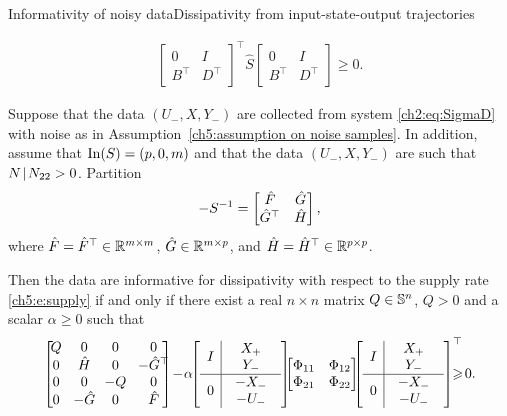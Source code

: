 \documentclass[aspectratio=169, handout, 10pt, hyperref=colorlinks]{beamer}
\begin{document}
\begin{frame}[allowframebreaks]{Informativity of noisy data}{Dissipativity from input-state-output trajectories}
\begin{lem}
\begin{align}
\begin{bmatrix}
    0&I \!\! \\
    B^\top&D^\top \!\!
    \end{bmatrix}^\top\!\!\!\! \hat{S}\!\! \begin{bmatrix}
    0&I \!\! \\
    B^\top&D^\top \!\!
    \end{bmatrix} \!\!\geq\! 0.
    \end{align}
    \end{lem}
     \label{ch5:t:noise 1}
    Suppose that the data $(U_-,X,Y_-)$ are collected from system \ref{ch2:eq:SigmaD} with noise as in Assumption~\ref{ch5:assumption on noise samples}.
    In addition, assume that $\In(S) = (p,0,m)$ and that the data $(U_- ,X,Y_- )$ are such that $N \schur N_{22} >0$. Partition 
    \begin{equation} \label{ch5:eq:partition of Sinv}
    -S\inv = \begin{bmatrix}
    \hatF&\hatG\\
    \hatG^\top  &\hatH
    \end{bmatrix},
    \end{equation}
    where $\hatF=\hatF^\top \in\R^{m\times m}$, $\hatG\in\R^{m\times p}$, and $\hatH=\hatH^\top \in\R^{p\times p}$. 

    Then the data are informative for dissipativity with respect to the supply rate \eqref{ch5:e:supply} if and only if there exist a real $n \times n$ matrix $Q \in \S{n}$, $Q >0$ and a scalar $\alpha\geq 0$ such that 
    \begin{equation}
    \begin{bmatrix}
        \! Q & \!0\! & \!0\! & 0 \!\!\! \\
        \! 0 & \!\hatH\! & \!0\! &-\hatG^\top \!\!\! \\
       \! 0 & \!0\! & \!-Q\! & 0 \!\!\! \\
       \! 0 & \!-\hatG\! & \!0\! & \hatF \!\!\!
        \end{bmatrix} \!-\! \alpha\!\!
        \None
         \!\!\!\!\geq\! 0. \label{ch5:eq:LMI2}
    \end{equation}
    \ethe
\end{frame}
\end{document}
